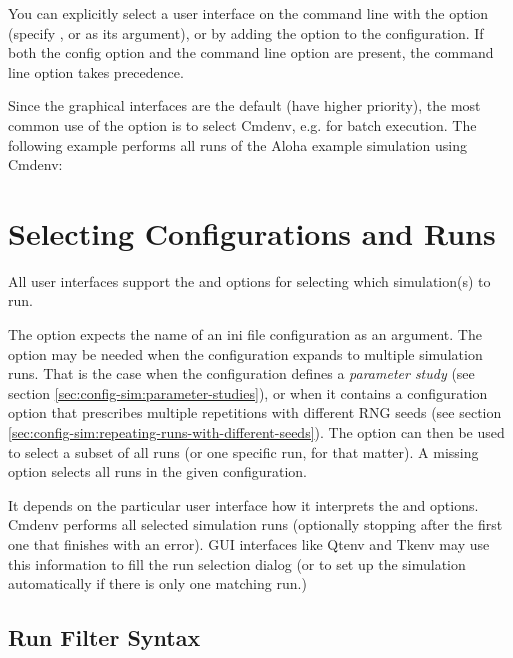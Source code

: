 You can explicitly select a user interface on the command line with the 
option (specify ,  or  as its argument), or by
adding the  option to the configuration. If both
the config option and the command line option are present, the command line option
takes precedence.

Since the graphical interfaces are the default (have higher priority), the most
common use of the  option is to select Cmdenv, e.g. for batch execution.
The following example performs all runs of the Aloha example simulation using
Cmdenv:



\section{Selecting Configurations and Runs}
\label{sec:run-sim:selecting-configuration-and-runs}

All user interfaces support the  and 
options for selecting which simulation(s) to run. 

The  option expects the name of an ini file configuration
as an argument. The  option may be needed when the configuration
expands to multiple simulation runs. That is the case when the
configuration defines a \textit{parameter study} (see section
\ref{sec:config-sim:parameter-studies}), or when it contains 
a  configuration option that prescribes 
multiple repetitions with different RNG seeds (see section 
\ref{sec:config-sim:repeating-runs-with-different-seeds}).
The  option can then be used to select a subset of all runs (or one
specific run, for that matter). A missing  option selects all runs in
the given configuration.

It depends on the particular user interface how it interprets the 
 and  options. Cmdenv performs all selected simulation runs
(optionally stopping after the first one that finishes with an error).
GUI interfaces like Qtenv and Tkenv may use this information to fill the
run selection dialog (or to set up the simulation automatically if there is
only one matching run.)


\subsection{Run Filter Syntax}
\label{sec:run-sim:selecting-configuration-and-runs:syntax}


